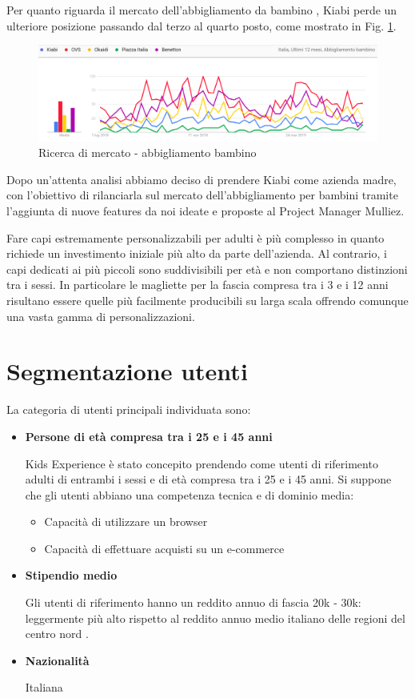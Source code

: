 \documentclass[12pt,italian,]{report}
\providecommand{\tightlist}{%
  \setlength{\itemsep}{0pt}\setlength{\parskip}{0pt}}
\begin{document}
Per quanto riguarda il mercato dell'abbigliamento da bambino \cite{gt}, Kiabi perde un ulteriore posizione passando dal terzo al quarto posto, come mostrato in Fig. \ref{abbigliamento_bambino}.

\begin{figure}[h]
\centering
\includegraphics{img/abbigliamento_bambino.png}
\caption{Ricerca di mercato - abbigliamento bambino}
\label{abbigliamento_bambino}
\end{figure}

Dopo un'attenta analisi abbiamo deciso di prendere Kiabi come azienda madre, con l'obiettivo di rilanciarla sul mercato dell'abbigliamento per bambini tramite l'aggiunta di nuove features da noi ideate e proposte al Project Manager Mulliez.

Fare capi estremamente personalizzabili per adulti è più complesso in quanto richiede un investimento iniziale più alto da parte dell'azienda. Al contrario, i capi dedicati ai più piccoli sono suddivisibili per età e non comportano distinzioni tra i sessi. In particolare le magliette per la fascia compresa tra i 3 e i 12 anni risultano essere quelle più facilmente producibili su larga scala offrendo comunque una vasta gamma di personalizzazioni.

\section{Segmentazione utenti}\label{segmentazione_utenti}

La categoria di utenti principali individuata sono:

\begin{itemize}
\item
  \textbf{Persone di età compresa tra i 25 e i 45 anni}

  Kids Experience è stato concepito prendendo come utenti di riferimento
  adulti di entrambi i sessi e di età compresa tra i 25 e i 45 anni. Si
  suppone che gli utenti abbiano una competenza tecnica e di dominio
  media:

  \begin{itemize}
  \tightlist
  \item
    Capacità di utilizzare un browser
  \item
    Capacità di effettuare acquisti su un e-commerce
  \end{itemize}
\item
  \textbf{Stipendio medio}

  Gli utenti di riferimento hanno un reddito annuo di fascia 20k - 30k:
  leggermente più alto rispetto al reddito annuo medio italiano delle
  regioni del centro nord \cite{redditomedio}.
\item
  \textbf{Nazionalità}

  Italiana
\end{itemize}
\end{document}
